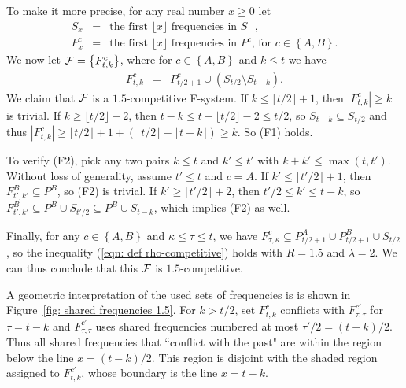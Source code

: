 \documentclass[11pt]{article}
\newcommand{\calF}{{\cal F}}
\newcommand{\braced}[1]{{ \left\{ #1 \right\} }}
\newcommand{\bigbrace}[1]{{ \big\{ #1 \big\} }}
\newcommand{\floor}[1]{{ \lfloor #1 \rfloor }}
\begin{document}
To make it more precise, for any real number $x\ge 0$ let
\begin{eqnarray*}
	S_x &=& \textrm{the first $\floor{x}$ frequencies in $S$ } , \\
	P^c_x &=& \textrm{the first $\floor{x}$ frequencies in $P^c$, for $c\in\braced{A,B}$}.
\end{eqnarray*}
We now let $\calF = \bigbrace{F^c_{t,k}}$, where for $c\in\braced{A,B}$ and $k\le t$ we
have
\begin{eqnarray*}
	F^c_{t,k} &=& P^c_{t/2+1} \cup (S_{t/2} \setminus S_{t-k} ).
\end{eqnarray*}
We claim that $\calF$ is a $1.5$-competitive F-system.
If $k\le \floor{t/2}+1$, then $|F^c_{t,k}|\ge k$ is trivial.
If $k\ge \floor{t/2}+2$, then $t- k \le t - \floor{t/2}- 2 \le  t/2$,
so $S_{t-k}\subseteq S_{t/2}$ and thus
$|F^c_{t,k}| \ge \floor{t/2} + 1 + ( \floor{t/2} - \floor{t - k} )
	\ge k$. So (F1) holds. 

To verify (F2),
pick any two pairs $k\le t$ and $k'\le t'$ with $k+k'\le\max(t,t')$. 
Without loss of generality, assume $t'\le t$ and $c = A$. 
If $k'\le \floor{t'/2}+1$, then $F^B_{t',k'} \subseteq P^B$, so
(F2) is trivial. If $k'\ge \floor{t'/2}+2$, then $t'/2\le k' \le t-k$, so
$F^B_{t',k'} \subseteq P^B \cup S_{t'/2}
			\subseteq P^B \cup S_{t-k}$,
which implies (F2) as well.

Finally, for any $c\in\braced{A,B}$ and $\kappa\le\tau\le t$, we have
$F^c_{\tau,\kappa} \subseteq P^A_{t/2+1}\cup P^B_{t/2+1} \cup S_{t/2}$,
so the inequality (\ref{eqn: def rho-competitive}) holds with 
$R = 1.5$ and $\lambda = 2$. We can thus conclude that this
$\calF$ is $1.5$-competitive.

\medskip

A geometric interpretation of the used sets of frequencies is is shown
in Figure~\ref{fig: shared frequencies 1.5}.  For $k > t/2$, set
$F^c_{t,k}$ conflicts with $F^{c'}_{\tau,\tau}$ for $\tau = t-k$ and
$F^{c'}_{\tau,\tau}$ uses shared frequencies numbered at most $\tau'/2
= (t-k)/2$. Thus all shared frequencies that ``conflict with the past"
are within the region below the line $x=(t-k)/2$. This region is
disjoint with the shaded region assigned to $F^{c'}_{t,k}$, whose
boundary is the line $x=t-k$.
\end{document}
